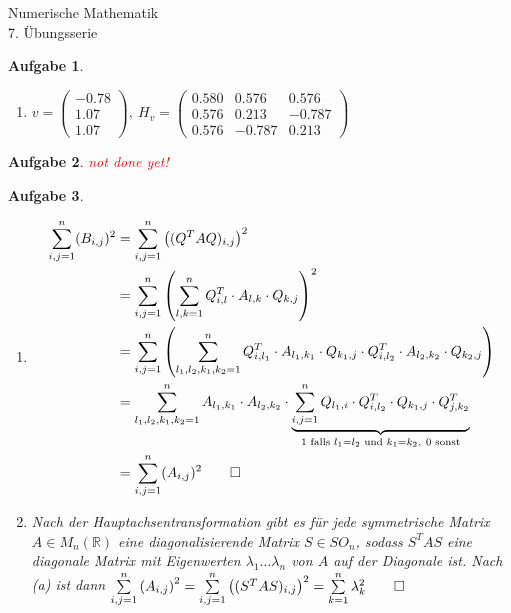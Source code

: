 \documentclass[11pt]{article}
\theoremstyle{break}
\newtheorem{task}{Aufgabe}
\def\R{\ensuremath{\mathbb{R}}}
\def\ndy{
    \textcolor{red} {\hfill not done yet!}
    \reversemarginpar
    \marginpar{\raggedleft\textcolor{red}{\rule{2mm}{2mm}}}
}
\newcommand{\hw}{7}
\begin{document}
\begin{center}
\Large{Numerische Mathematik}\\
\large{\hw. Übungsserie}
\end{center}
\begin{task}
    \hfill\vspace{-5mm}
    \begin{enumerate}[label={(\alph*)}]
        \item $v = \begin{pmatrix}
            -0.78\\
            1.07\\
            1.07
        \end{pmatrix},\ H_v = \begin{pmatrix}
            0.580 & 0.576 & 0.576\\
            0.576 & 0.213 & -0.787\\
            0.576 & -0.787 & 0.213
        \end{pmatrix}$
    \end{enumerate}
\end{task}
\begin{task}
    \ndy
\end{task}
\begin{task}
    \hfill\vspace{-5mm}
    \begin{enumerate}[label={(\alph*)}]
        \item \begin{align*}
            \sum\limits_{i,j=1}^{n} (B_{i,j})^2 &=\sum\limits_{i,j=1}^{n} \left((Q^T A Q)_{i,j}\right)^2\\
            &=\sum\limits_{i,j=1}^{n} \left(\sum\limits_{l,k=1}^{n} Q^T_{i,l}\cdot A_{l,k}\cdot Q_{k,j}\right)^2\\
            &=\sum\limits_{i,j=1}^{n}\left(\sum\limits_{l_1,l_2,k_1,k_2=1}^{n} Q^T_{i,l_1}\cdot A_{l_1,k_1}\cdot Q_{k_1,j}\cdot Q^T_{i,l_2}\cdot A_{l_2,k_2}\cdot Q_{k_2,j}\right)\\
            &=\sum\limits_{l_1,l_2,k_1,k_2=1}^{n} A_{l_1,k_1}\cdot A_{l_2,k_2}\cdot \underbrace{\sum\limits_{i,j=1}^{n} Q_{l_1,i}\cdot Q^T_{i,l_2}\cdot Q_{k_1,j}\cdot Q^T_{j,k_2}}_{1\text{ falls } l_1=l_2\text{ und } k_1=k_2,\ 0\text{ sonst}}\\
            &=\sum\limits_{i,j=1}^{n} (A_{i,j})^2\qed
        \end{align*}
        \item Nach der Hauptachsentransformation gibt es für jede symmetrische Matrix $A\in M_n(\R)$ eine diagonalisierende Matrix $S\in SO_n$, sodass $S^T A S$ eine diagonale Matrix mit Eigenwerten $\lambda_1\ldots\lambda_n$ von $A$ auf der Diagonale ist. Nach (a) ist dann $\sum\limits_{i,j=1}^n \left(A_{i,j}\right)^2 = \sum\limits_{i,j=1}^n \left((S^T A S)_{i,j}\right)^2 = \sum\limits_{k=1}^n \lambda_{k}^2\qed$
    \end{enumerate}
\end{task}
\end{document}
